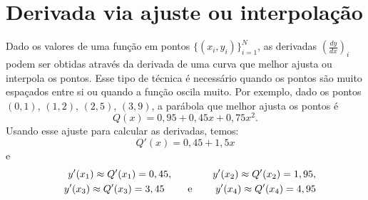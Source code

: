 \section{Derivada via ajuste ou interpolação}

Dado os valores de uma função em pontos $\{(x_i,y_i)\}_{i=1}^N$, as derivadas $\left(\frac{dy}{dx}\right)_i$ podem ser obtidas através da derivada de uma curva que melhor ajusta ou interpola os pontos. Esse tipo de técnica é necessário quando os pontos são muito espaçados entre si ou quando a função oscila muito. Por exemplo, dado os pontos $(0,1)$, $(1,2)$, $(2,5)$, $(3,9)$, a parábola que melhor ajusta os pontos é
$$
Q(x)=0,95 + 0,45x + 0,75x^2.
$$
Usando esse ajuste para calcular as derivadas, temos:
$$
Q'(x)=0,45 + 1,5x
$$
e
\begin{eqnarray*}
&&y'(x_1)\approx Q'(x_1)=0,45, \qquad\qquad y'(x_2)\approx Q'(x_2)=1,95, \\&& y'(x_3)\approx Q'(x_3)=3,45 \qquad ~ \hbox{e} ~ \qquad y'(x_4)\approx Q'(x_4)=4,95
\end{eqnarray*}

